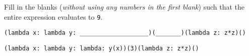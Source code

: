 \begin{blocksection}
\question Fill in the blanks (\emph{without using any numbers in the first blank}) such that the entire expression evaluates to \texttt{9}.

\ifprintanswers\else
\begin{lstlisting}
(lambda x: lambda y: ___________________)(_______)(lambda z: z*z)()
\end{lstlisting}
\fi

\begin{solution}
\begin{lstlisting}
(lambda x: lambda y: lambda: y(x))(3)(lambda z: z*z)()
\end{lstlisting}
\end{solution}
\end{blocksection}
